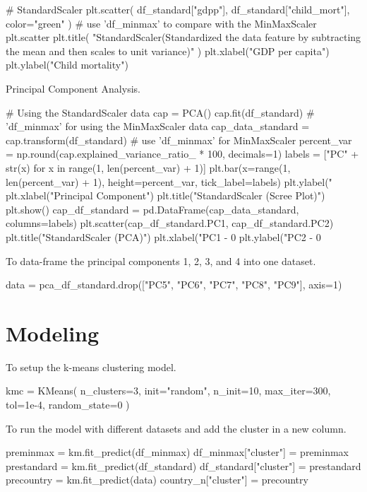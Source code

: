 \documentclass{swfuthesise}
\begin{document}
\begin{pythoncode}
# StandardScaler
plt.scatter(
    df_standard["gdpp"], df_standard["child_mort"], color="green"
)  # use 'df_minmax' to compare with the MinMaxScaler
plt.scatter
plt.title(
    "StandardScaler\n(Standardized the data feature by subtracting the mean and then scales to unit variance)"
)
plt.xlabel("GDP per capita")
plt.ylabel("Child mortality")
\end{pythoncode}

Principal Component Analysis.

\begin{pythoncode}
# Using the StandardScaler data
cap = PCA()
cap.fit(df_standard)  # 'df_minmax' for using the MinMaxScaler data
cap_data_standard = cap.transform(df_standard)  # use 'df_minmax' for MinMaxScaler
percent_var = np.round(cap.explained_variance_ratio_ * 100, decimals=1)
labels = ["PC" + str(x) for x in range(1, len(percent_var) + 1)]
plt.bar(x=range(1, len(percent_var) + 1), height=percent_var, tick_label=labels)
plt.ylabel("%
plt.xlabel("Principal Component")
plt.title("StandardScaler (Scree Plot)")
plt.show()
cap_df_standard = pd.DataFrame(cap_data_standard, columns=labels)
plt.scatter(cap_df_standard.PC1, cap_df_standard.PC2)
plt.title("StandardScaler (PCA)")
plt.xlabel("PC1 - {0}%
plt.ylabel("PC2 - {0}%
\end{pythoncode}

To data-frame the principal components 1, 2, 3, and 4 into one dataset.

\begin{pythoncode}
data = pca_df_standard.drop(["PC5", "PC6", "PC7", "PC8", "PC9"], axis=1)
\end{pythoncode}

\section{Modeling}

To setup the k-means clustering model.

\begin{pythoncode}
kmc = KMeans(
    n_clusters=3, init="random", n_init=10, max_iter=300, tol=1e-4, random_state=0
)
\end{pythoncode}

To run the model with different datasets and add the cluster in a new column. 

\begin{pythoncode}
preminmax = km.fit_predict(df_minmax)
df_minmax["cluster"] = preminmax
prestandard = km.fit_predict(df_standard)
df_standard["cluster"] = prestandard
precountry = km.fit_predict(data)
country_n["cluster"] = precountry
\end{pythoncode}
\end{document}
